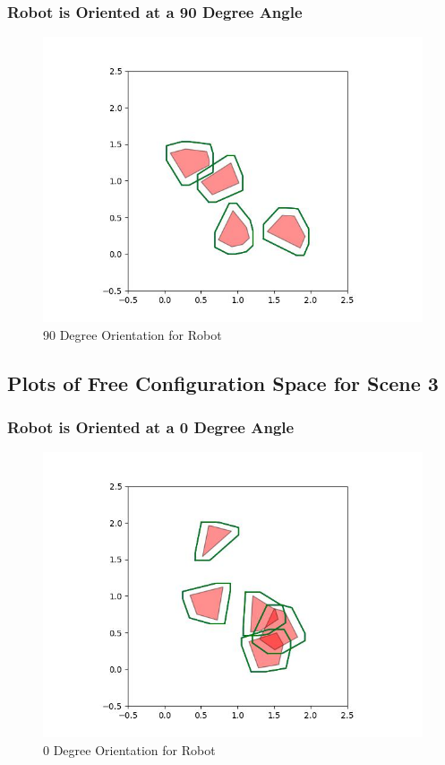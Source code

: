 \documentclass{article}
\begin{document}
\newpage
\subsubsection{Robot is Oriented at a 90 Degree Angle}
\begin{figure}[h!]
	\includegraphics[width= 0.9 \linewidth]{Problem3_minkowski2_90.jpg}
	\centering
	\caption{90 Degree Orientation for Robot}
	\label{Problem3_minkowski2_90.jpg}
\end{figure}

\newpage
\subsection{Plots of Free Configuration Space for Scene 3}
\subsubsection{Robot is Oriented at a 0 Degree Angle}
\begin{figure}[h!]
	\includegraphics[width= 0.9 \linewidth]{Problem3_minkowski3_0.jpg}
	\centering
	\caption{0 Degree Orientation for Robot}
	\label{Problem3_minkowski3_0.jpg}
\end{figure}
\end{document}
